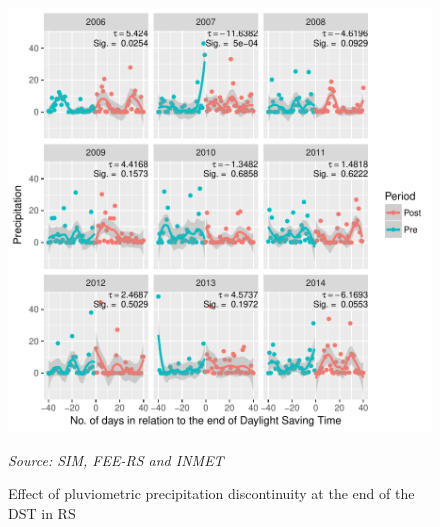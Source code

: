 \documentclass[12pt,openright,oneside,a4paper,english,french,spanish]{abntex2}
\numberwithin{table}{section} %
\numberwithin{figure}{section} %
\newcommand{\source}[1]{\textit{#1}}
\begin{document}
\begin{otherlanguage}{english}
\begin{subappendices}
\begin{figure}[H]
\begin{center}
\includegraphics{TESE_DE_DOUTORADO_RENAN_FINAL-plot_efeito_descontinuo_prec_saida}
\end{center}
\caption{Effect of pluviometric precipitation discontinuity at the end of the DST in RS}
\source{Source: SIM, FEE-RS and INMET}
\label{fig:efeito_descon_prec_saida_RS}
\end{figure}



\end{subappendices}
\end{otherlanguage}
\end{document}
